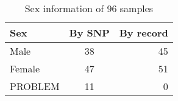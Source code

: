\begin{table}[ht]
\centering
\caption{Sex information of 96 samples} 
\begin{tabular}{lcr}
  \hline
Sex & By SNP & By record \\ 
  \hline
Male & 38 & 45 \\ 
  Female & 47 & 51 \\ 
  PROBLEM & 11 & 0 \\ 
   \hline
\end{tabular}
\end{table}
